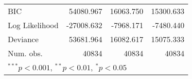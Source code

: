 \begin{tabular}{l D{)}{)}{13)3} D{)}{)}{13)3} D{)}{)}{13)3} }
BIC                                & 54080.967              & 16063.750               & 15300.633               \\
Log Likelihood                     & -27008.632             & -7968.171               & -7480.440               \\
Deviance                           & 53681.964              & 16082.617               & 15075.333               \\
Num. obs.                          & 40834                  & 40834                   & 40834                   \\
\bottomrule
{}
\end{tabular}
